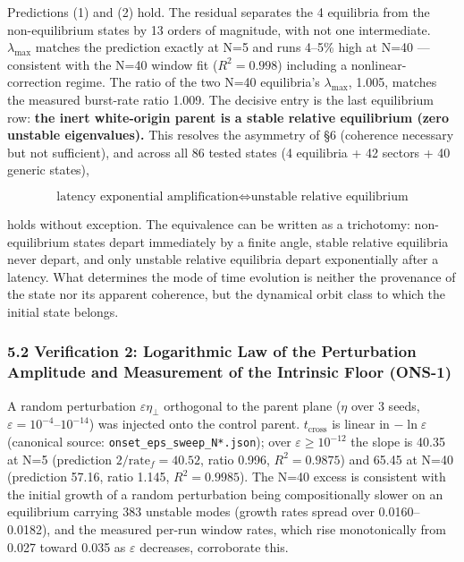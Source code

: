 \documentclass[
  a4paper,
]{article}
\begin{document}
Predictions (1) and (2) hold. The residual separates the 4 equilibria
from the non-equilibrium states by 13 orders of magnitude, with not one
intermediate. \(\lambda_{\max}\) matches the prediction exactly at N=5
and runs 4--5\% high at N=40 --- consistent with the N=40 window fit
(\(R^2=0.998\)) including a nonlinear-correction regime. The ratio of
the two N=40 equilibria's \(\lambda_{\max}\), 1.005, matches the
measured burst-rate ratio 1.009. The decisive entry is the last
equilibrium row: \textbf{the inert white-origin parent is a stable
relative equilibrium (zero unstable eigenvalues).} This resolves the
asymmetry of §6 (coherence necessary but not sufficient), and across all
86 tested states (4 equilibria + 42 sectors + 40 generic states),

\[\boxed{\text{latency exponential amplification}\iff\text{unstable relative equilibrium}}\]

holds without exception. The equivalence can be written as a trichotomy:
non-equilibrium states depart immediately by a finite angle, stable
relative equilibria never depart, and only unstable relative equilibria
depart exponentially after a latency. What determines the mode of time
evolution is neither the provenance of the state nor its apparent
coherence, but the dynamical orbit class to which the initial state
belongs.

\subsubsection{5.2 Verification 2: Logarithmic Law of the Perturbation
Amplitude and Measurement of the Intrinsic Floor
(ONS-1)}\label{verification-2-logarithmic-law-of-the-perturbation-amplitude-and-measurement-of-the-intrinsic-floor-ons-1}

A random perturbation \(\varepsilon\eta_\perp\) orthogonal to the parent
plane (\(\eta\) over 3 seeds, \(\varepsilon=10^{-4}\)--\(10^{-14}\)) was
injected onto the control parent. \(t_{\mathrm{cross}}\) is linear in
\(-\ln\varepsilon\) (canonical source:
\texttt{onset\_eps\_sweep\_N*.json}); over \(\varepsilon\ge10^{-12}\)
the slope is 40.35 at N=5 (prediction \(2/\text{rate}_f=40.52\), ratio
0.996, \(R^2=0.9875\)) and 65.45 at N=40 (prediction 57.16, ratio 1.145,
\(R^2=0.9985\)). The N=40 excess is consistent with the initial growth
of a random perturbation being compositionally slower on an equilibrium
carrying 383 unstable modes (growth rates spread over 0.0160--0.0182),
and the measured per-run window rates, which rise monotonically from
0.027 toward 0.035 as \(\varepsilon\) decreases, corroborate this.
\end{document}
